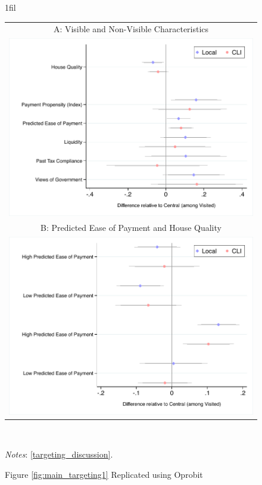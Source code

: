 \documentclass[12pt,english]{article}
\makeatletter
\renewcommand{\footnotesize}{\fontsize{9pt}{11pt}\selectfont}\usepackage[unicode=true,
\newcommand*{\centerfloat}{%
  \parindent \z@
  \leftskip \z@ \@plus 1fil \@minus \textwidth
  \rightskip\leftskip
  \parfillskip \z@skip}
\makeatother
\begin{document}
\begin{figure}[H]
	\centering{}\caption*{
		\label{fig:main_targeting1_R1} Figure \ref{fig:main_targeting1} Replicated using Oprobit}
	\centering
	\centerfloat
	\begin{tabular}{c}
		A: Visible and Non-Visible Characteristics\\
		\includegraphics[scale=.62]{Output/chars_visitedR1.pdf}\\
		B: Predicted Ease of Payment and House Quality\\
		\includegraphics[scale=.8]{Output/chars_PEXHQ_R1.pdf}\\
	\end{tabular}
	\usebox{\tablebox}\\[1ex]
	\parbox{6in}{\footnotesize \textit{Notes}:  \ref{targeting_discussion}.}
\end{figure}
\end{document}
